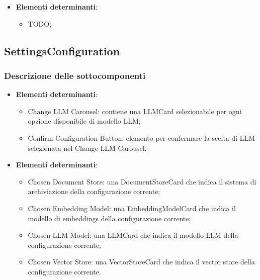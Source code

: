 \documentclass[10pt, a4paper]{article}
\begin{document}
\label{ThemeSelectionDettaglio}
\begin{itemize}
    \item \textbf{Elementi determinanti}:
     \begin{itemize}
       \item TODO;
    \end{itemize}
\end{itemize}


\subsection{SettingsConfiguration}
\subsubsection{Descrizione delle sottocomponenti}

\label{ChangeLLMConfigurationDettaglio}
\begin{itemize}
    \item \textbf{Elementi determinanti}:
     \begin{itemize}
        \item Change LLM Carousel: contiene una LLMCard selezionabile per ogni opzione disponibile di modello LLM;
        \item Confirm Configuration Button: elemento per confermare la scelta di LLM selezionata nel Change LLM Carousel.
    \end{itemize}
\end{itemize}



\label{CurrentConfigurationCarouselDettaglio}
\begin{itemize}
    \item \textbf{Elementi determinanti}:
     \begin{itemize}
        \item Chosen Document Store: una DocumentStoreCard che indica il sistema di archiviazione della configurazione corrente;
        \item Chosen Embedding Model: una EmbeddingModelCard che indica il modello di embeddings della configurazione corrente;
        \item Chosen LLM Model: una LLMCard che indica il modello LLM della configurazione corrente;
        \item Chosen Vector Store: una VectorStoreCard che indica il vector store della configurazione corrente.
    \end{itemize}
\end{itemize}
\end{document}
